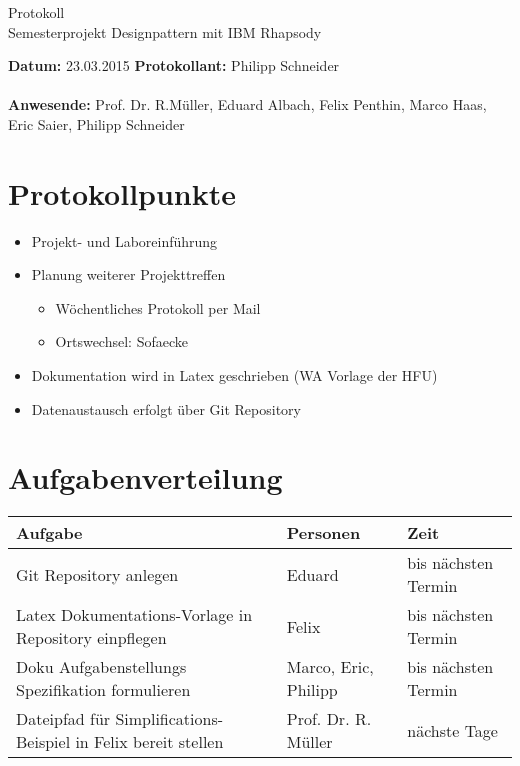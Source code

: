 \documentclass[a4paper]{article}
\begin{document}
\begin{center}
{\Huge Protokoll}\\
{\large Semesterprojekt Designpattern mit IBM Rhapsody}\\
\end{center}
\vspace*{10mm}
\textbf{Datum:} 23.03.2015 \hfill \textbf{Protokollant:} Philipp Schneider\\
\\
\textbf{Anwesende:} Prof. Dr. R.Müller, Eduard Albach, Felix Penthin, Marco Haas, Eric Saier, Philipp Schneider\\
\section*{Protokollpunkte}
 \begin{itemize}
      \item Projekt- und Laboreinführung
      \item Planung weiterer Projekttreffen
      \begin{itemize}
         \item Wöchentliches Protokoll per Mail
         \item Ortswechsel: Sofaecke
      \end{itemize}
      \item Dokumentation wird in Latex geschrieben (WA Vorlage der HFU)
      \item Datenaustausch erfolgt über Git Repository
   \end{itemize}
\section*{Aufgabenverteilung}
\begin{tabular}{|l|l|l|}\hline
   \textbf{Aufgabe} & \textbf{Personen} & \textbf{Zeit} \\ \hline \hline
   Git Repository anlegen & Eduard & bis nächsten Termin \\ \hline
   Latex Dokumentations-Vorlage in Repository einpflegen & Felix & bis nächsten Termin \\ \hline
   Doku Aufgabenstellungs Spezifikation formulieren & Marco, Eric, Philipp & bis nächsten Termin \\ \hline
   Dateipfad für Simplifications-Beispiel in Felix bereit stellen & Prof. Dr. R. Müller & nächste Tage \\ \hline
 \end{tabular}
\end{document}
